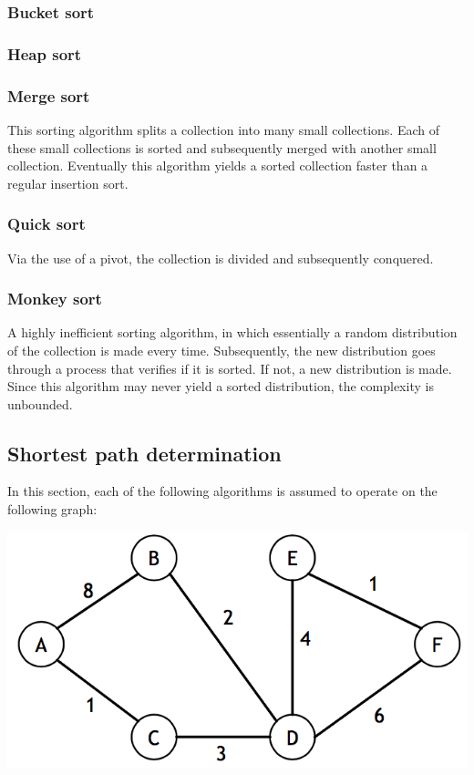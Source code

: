 \documentclass{article}
\begin{document}
\subsubsection{Bucket sort}
\subsubsection{Heap sort}
\subsubsection{Merge sort}
This sorting algorithm splits a collection into many small collections.
Each of these small collections is sorted and subsequently merged with another small collection.
Eventually this algorithm yields a sorted collection faster than a regular insertion sort.

\subsubsection{Quick sort}
Via the use of a pivot, the collection is divided and subsequently conquered.

\subsubsection{Monkey sort}
A highly inefficient sorting algorithm, in which essentially a random distribution of the collection is made every time.
Subsequently, the new distribution goes through a process that verifies if it is sorted. If not, a new distribution is made.
Since this algorithm may never yield a sorted distribution, the complexity is unbounded.

\newpage

\subsection{Shortest path determination}
In this section, each of the following algorithms is assumed to operate on the following graph:

\includegraphics[width=\textwidth]{sample_graph}
\end{document}
